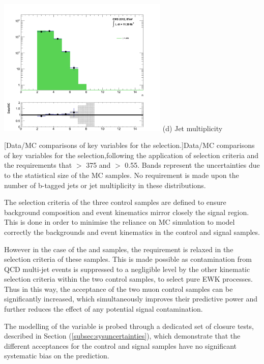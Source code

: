 \begin{itemize}
\begin{minipage}{\linewidth}
\begin{minipage}{.48\textwidth}
\end{minipage}
\begin{minipage}{.48\textwidth}
\centering
\includegraphics[width = 3.2in]{plots/photon_njet_datamc.pdf}
(d) Jet multiplicity
\end{minipage}
[Data/MC comparisons of key variables for the \gpjets selection.]{Data/MC comparisons of key variables for the \gpjets selection,following the application of selection criteria and the requirements that \theht $>$ 375 \GeV and \alphat $>$ 0.55. Bands represent the uncertainties due to the statistical size of the MC samples. No requirement is made upon the number of b-tagged jets or jet multiplicity in these distributions.}\label{fig:photonmcplots}
\end{minipage}


\end{itemize}


The selection criteria of the three control samples are defined to ensure background composition and event kinematics mirror closely the signal region. This is done in order to minimise the reliance on MC simulation to model correctly the backgrounds and event kinematics in the control and signal samples. 

However in the case of the \mupjets and \dimupjets samples, the \alphat requirement is relaxed in the selection criteria of these samples. This is made possible as contamination from QCD multi-jet events is suppressed to a negligible level by the other kinematic selection criteria within the two control samples, to select pure \ac{EWK} processes. Thus in this way, the acceptance of the two muon control samples can be significantly increased, which simultaneously improves their predictive power and further reduces the effect of any potential signal contamination. 

The modelling of the \alphat variable is probed through a dedicated set of closure tests, described in Section (\ref{subsec:sysuncertainties}), which demonstrate that the different \alphat acceptances for the control and signal samples have no significant systematic bias on the prediction.


